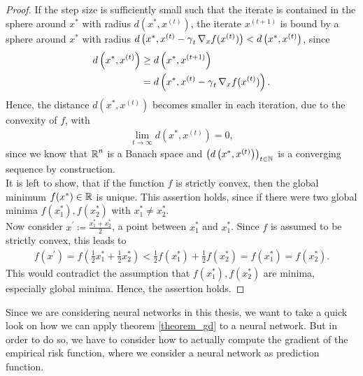 \begin{proof}
If the step size is sufficiently small such that the iterate is contained in the sphere around $x^{\ast}$ with radius $d\left(x^{\ast}, x^{(t)}\right)$,
the iterate $x^{(t+1)}$ is bound by a sphere around $x^{\ast}$ with radius $d\left(x^{\ast}, x^{(t)} - \operatorname{\gamma}_t \nabla_x f(x^{(t)})\right) < d\left(x^{\ast}, x^{(t)}\right)$, since
\begin{align*}
d\left(x^{\ast}, x^{(t)}\right) &\geq d\left(x^{\ast}, x^{(t+1)}\right)\\
&= d\left(x^{\ast}, x^{(t)} - \operatorname{\gamma}_t \nabla_x f(x^{(t)})\right).
\end{align*}
Hence, the distance $d(x^{\ast}, x^{(t)})$ becomes smaller in each iteration, due to the convexity of $f$, with
\begin{align*}
\lim_{t\to\infty} d\left(x^{\ast}, x^{(t)}\right) = 0,
\end{align*}
since we know that $\operatorname{\mathbb{R}}^n$ is a Banach space and $\left(d\left(x^{\ast}, x^{(t)}\right)\right)_{t\in\operatorname{\mathbb{N}}}$ is a converging sequence by construction.\\
It is left to show, that if the function $f$ is strictly convex, then the global minimum $f(x^{\ast})\in\operatorname{\mathbb{R}}$ is unique. This assertion holds, since if there were two global minima $f\left(x_1^{\ast}\right), f\left(x_2^{\ast}\right)$ with $x_1^{\ast} \neq x_2^{\ast}$.\\
Now consider $x^{\prime} \coloneqq \frac{x_1^{\ast} + x_2^{\ast}}{2}$, a point between $x_1^{\ast}$ and $x_1^{\ast}$. Since $f$ is assumed to be strictly convex, this leads to
\begin{align*}
f\left(x^{\prime} \right) = f\left(\frac{1}{2}x_1^{\ast} + \frac{1}{2} x_2^{\ast}\right) < \frac{1}{2} f\left(x_1^{\ast} \right) + \frac{1}{2} f\left(x_2^{\ast}\right) = f\left(x_1^{\ast}\right) = f\left(x_2^{\ast}\right).
\end{align*}
This would contradict the assumption that $f\left(x_1^{\ast}\right), f\left(x_2^{\ast}\right)$ are minima, especially global minima. Hence, the assertion holds.
\end{proof}


Since we are considering neural networks in this thesis, we want to take a quick look on how we can apply theorem \ref{theorem_gd} to a neural network. But in order to do so, we have to consider how to actually compute the gradient of the empirical risk function, where we consider a neural network as prediction function.


